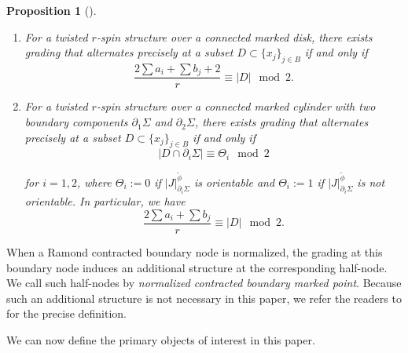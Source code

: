\documentclass[11pt]{amsart}
\newtheorem{prop}[dummy]{Proposition}
\theoremstyle{definition}
\theoremstyle{remark}
\newcommand{\<}{\left<}
\renewcommand{\>}{\right>}
\numberwithin{equation}{section}
\begin{document}
\begin{prop}[{\cite[Proposition 2.3]{BCT2}}]
\begin{enumerate}
\item\label{it lift compatible parity}
For %
a twisted $r$-spin structure over a connected marked disk, there exists grading that alternates precisely at a subset $D \subset \{x_j\}_{j \in B}$ if and only %
if
\begin{equation}\label{eq parity}
   \frac{2\sum a_i + \sum b_j+ 2}{r}\equiv |D| \mod 2.
\end{equation}

\item\label{it lift compatible parity g=1}
For %
a twisted $r$-spin structure over a connected marked cylinder with two boundary components $\partial_1 \Sigma$ and $\partial_2 \Sigma$, there exists grading that alternates precisely at a subset $D \subset \{x_j\}_{j \in B}$ if and only if
\begin{equation}\label{eq boundarywise pairty}
    |D\cap \partial_i \Sigma| \equiv  \Theta_i \mod 2
\end{equation}

for $i=1,2$, where $\Theta_i:=0$ if $|J|^{\tilde\phi}_{\partial_i\Sigma}$ is orientable and $\Theta_i:=1$ if $|J|^{\tilde\phi}_{\partial_i\Sigma}$ is not orientable.
In particular, we have
\begin{equation}\label{eq compatitable pairty g=1}
   \frac{2\sum a_i + \sum b_j}{r} \equiv |D| \mod 2.
\end{equation}

\end{enumerate}
\end{prop}

When a Ramond contracted boundary node is normalized, the grading at this boundary node induces an additional structure at the corresponding half-node. We call such half-nodes by \textit{normalized contracted boundary marked point}. Because such an additional structure is not necessary in this paper, we refer the readers to \cite[Definition 2.5]{TZ1} for the precise definition. 



We can now define the primary objects of interest in %
this paper.
\end{document}
